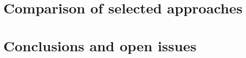 \documentclass{iosart2c}
\begin{document}
%

\section{Comparison of selected approaches}
\label{sec:analysis}


%

\section{Conclusions and open issues }
\label{sec:conc}











\end{document}
